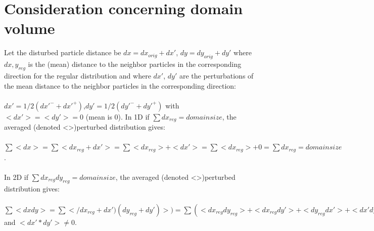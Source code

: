 \documentclass{report}
\begin{document}
\appendix
\appendixpage
\addappheadtotoc

\chapter{Consideration concerning domain volume}
\label{app:DomainVolume}
 Let the disturbed particle distance be $dx=dx_{\mathit{orig}}+dx'$, $dy=dy_{\mathit{orig}}+dy'$ where $dx,y_{\mathit{reg}}$ is the (mean) distance to the neighbor particles in the corresponding direction for the regular distribution
 and where $dx'$, $dy'$ are the perturbations of the mean distance to the neighbor particles in the corresponding direction:\\
\\
 $dx'=1/2(dx'^-+dx'^+)$,$dy'=1/2(dy'^-+dy'^+)$ with $<dx'>=<dy'>=0$ (mean is 0).
 In 1D if $\sum dx_{\mathit{reg}}=domainsize$, the averaged (denoted <>)perturbed distribution gives: \\
\\
$\sum <dx>=\sum <dx_{\mathit{reg}}+dx'>=\sum <dx_{\mathit{reg}}>+<dx'>=\sum<dx_{\mathit{reg}}>+0=\sum dx_{\mathit{reg}}=domainsize$.\\
\\
 In 2D if $\sum dx_{\mathit{reg}}dy_{\mathit{reg}}=domainsize$, the averaged (denoted <>)perturbed distribution gives: \\
\\
$\sum <dxdy>=\sum </dx_{\mathit{reg}}+dx')(dy_{\mathit{reg}}+dy')>)=\sum (<dx_{\mathit{reg}}dy_{\mathit{reg}}>+<dx_{\mathit{reg}}dy'>+<dy_{\mathit{reg}}dx'>+<dx'dy>)=\sum (dx_{\mathit{reg}}dy_{\mathit{reg}})+\sum (<dx'dy'>)=domainsize+sum(<dx'dy'>)$
 and $<dx'*dy'>\neq0$. 
\end{document}
